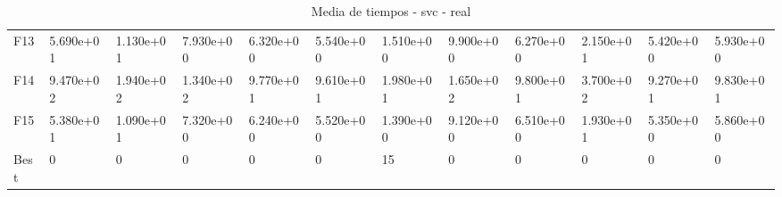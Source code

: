 \begin{table}
\begin{adjustbox}{width=\linewidth}
\begin{tabular}{llllllllllll}
            F13  & 5.690e+01 & 1.130e+01 & 7.930e+00 & 6.320e+00 & 5.540e+00 & 1.510e+00 & 9.900e+00 & 6.270e+00 & 2.150e+01 & 5.420e+00 & 5.930e+00 \\
            F14  & 9.470e+02 & 1.940e+02 & 1.340e+02 & 9.770e+01 & 9.610e+01 & 1.980e+01 & 1.650e+02 & 9.800e+01 & 3.700e+02 & 9.270e+01 & 9.830e+01 \\
            F15  & 5.380e+01 & 1.090e+01 & 7.320e+00 & 6.240e+00 & 5.520e+00 & 1.390e+00 & 9.120e+00 & 6.510e+00 & 1.930e+01 & 5.350e+00 & 5.860e+00 \\
            Best & 0         & 0         & 0         & 0         & 0         & 15        & 0         & 0         & 0         & 0         & 0         \\
            \bottomrule
        \end{tabular}
    \end{adjustbox}
    \caption{Media de tiempos - svc - real}
    \label{tab:mean_time_svc_real}
\end{table}

